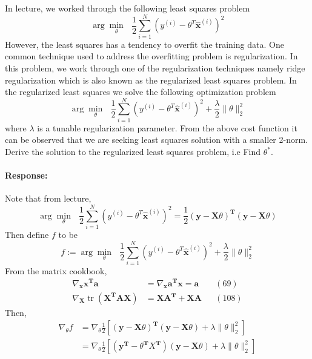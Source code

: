 \documentclass [11pt] {article}
\newcommand{\T}{\bf{T}}
\newcommand{\A}{\bf{A}}
\newcommand{\AT}{\bf{A$^{\T}$}}
\newcommand{\X}{\bf{X}}
\newcommand{\x}{\bf{x}}
\newcommand{\y}{\bf{y}}
\newenvironment{response}{\begin{responseframe}\vspace{-10pt}\paragraph{Response:}}{\end{responseframe}}
\DeclareMathOperator{\tr}{tr}
\renewcommand{\bf}[1]{\textbf{{#1}}}
\begin{document}
\begin{enumerate}
        In lecture, we worked through the following least squares problem
        \[\arg \underset{\theta}{\min} \text{ } \frac{1}{2} \sum^{N}_{i = 1} (y^{(i)} - \theta^T \hat{\x}^{(i)})^2\]
        However, the least squares has a tendency to overfit the training data. One common 
        technique used to address the overfitting problem is regularization. In this problem, 
        we work through one of the regularization techniques namely ridge regularization which 
        is also known as the regularized least squares problem. In the regularized least 
        squares we solve the following optimization problem
        \[\arg \underset{\theta}{\min} \text{ } \frac{1}{2} \sum^{N}_{i = 1} (y^{(i)} - \theta^T \hat{\x}^{(i)})^2 + \frac{\lambda}{2} \|\theta\|^2_2\]
        where $\lambda$ is a tunable regularization parameter. From the above cost function it 
        can be observed that we are seeking least squares solution with a smaller 2-norm. 
        Derive the solution to the regularized least squares problem, i.e Find $\theta^*$.
        \begin{adjustwidth}{-8.4em}{-6em}
            \begin{response}
                Note that from lecture, 
                \[
                    \arg \underset{\theta}{\min} \text{ } \frac{1}{2} \sum^{N}_{i = 1} (y^{(i)} - \theta^T \hat{\x}^{(i)})^2 
                    = \frac{1}{2} \left( \y - \X \theta \right)^{\T} \left( \y - \X \theta \right)
                \]
                Then define $f$ to be
                \[ 
                    f := \arg \underset{\theta}{\min} \text{ } \frac{1}{2} \sum^{N}_{i = 1} (y^{(i)} - \theta^T \hat{\x}^{(i)})^2 + \frac{\lambda}{2} \|\theta\|^2_2
                \]
                From the matrix cookbook,
                \begin{align*}
                    \nabla_{\x} \x^{\T} \bf{a} &= \nabla_{\x} \bf{a}^{\T} \x = \bf{a} && (69) \\
                    \nabla_{\X} \tr \left( \X^{\T} \A \X \right) &= \X \AT + \X \A && (108)
                \end{align*}
                Then,
                \begin{align*}
                    \nabla_{\theta} f
                &= \nabla_{\theta} \frac{1}{2} \left[ \left( \y - \X \theta \right)^{\T} \left( \y - \X \theta \right) + \lambda \|\theta\|^2_2 \right] \\
                &= \nabla_{\theta} \frac{1}{2} \left[ \left( \y^{\T} - \theta^{\T} X^{\T} \right) \left( \y - \X \theta \right) + \lambda \|\theta\|^2_2 \right] \\

\end{align*}
\end{response}
\end{adjustwidth}
\end{enumerate}
\end{document}
